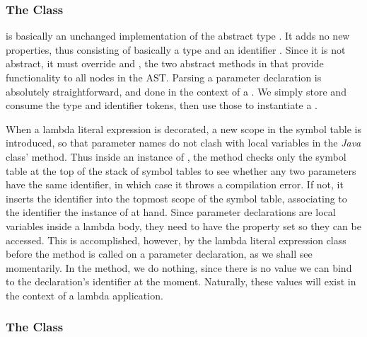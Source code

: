 \subsubsection{The  Class}

 is basically an unchanged implementation of the abstract type . It adds no new properties, thus consisting of basically a type  and an identifier . Since it is not abstract, it must override  and , the two abstract methods in  that provide functionality to all nodes in the AST. Parsing a parameter declaration is absolutely straightforward, and done in the context of a . We simply store and consume the type and identifier tokens, then use those to instantiate a .

When a lambda literal expression is decorated, a new scope in the symbol table is introduced, so that parameter names do not clash with local variables in the \emph{Java} class'  method. Thus inside an instance of , the  method checks only the symbol table at the top of the stack of symbol tables to see whether any two parameters have the same identifier, in which case it throws a compilation error. If not, it inserts the identifier into the topmost scope of the symbol table, associating to the identifier the instance of  at hand. Since parameter declarations are local variables inside a lambda body, they need to have the  property set so they can be accessed. This is accomplished, however, by the lambda literal expression class before the  method is called on a parameter declaration, as we shall see momentarily. In the  method, we do nothing, since there is no value we can bind to the declaration's identifier at the moment. Naturally, these values will exist in the context of a lambda application.

\subsubsection{The  Class}

